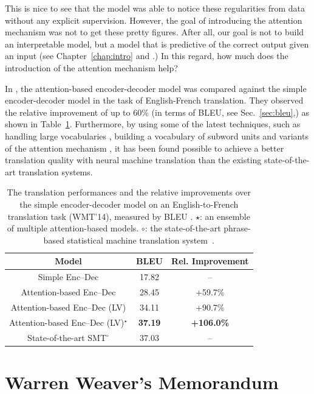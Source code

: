 \documentclass{report}
\begin{document}
This is nice to see that the model was able to notice these regularities from
data without any explicit supervision. However, the goal of introducing the
attention mechanism was not to get these pretty figures. After all, our goal is
not to build an interpretable model, but a model that is predictive of the
correct output given an input (see Chapter~\ref{chap:intro} and
\cite{breiman2001statistical}.) In this regard, how much does the introduction
of the attention mechanism help?

In \cite{bahdanau2014neural}, the attention-based encoder-decoder model was
compared against the simple encoder-decoder model in the task of English-French
translation. They observed the relative improvement of up to 60\% (in terms of
BLEU, see Sec.~\ref{sec:bleu},) as shown in Table~\ref{tab:att_nmt}.
Furthermore, by using some of the latest techniques, such as handling large
vocabularies \cite{jean2014using}, building a vocabulary of subword units
\cite{sennrich2015neural} and variants of the attention mechanism
\cite{luong2015effective}, it has been found possible to achieve a better translation
quality with neural machine translation than the existing state-of-the-art
translation systems.
    

\begin{table}[ht]
    \centering
    \begin{tabular}{c|c|c}
    Model & BLEU & Rel. Improvement \\
    \hline
    \hline
    Simple Enc--Dec & 17.82 &  -- \\
    Attention-based Enc--Dec & 28.45 & +59.7\% \\
    Attention-based Enc--Dec (LV) & 34.11 & +90.7\% \\
    Attention-based Enc--Dec (LV)$^\star$ & {\bf 37.19} & {\bf +106.0\%} \\
    \hline
    State-of-the-art SMT$^\circ$ & 37.03 & -- 
    \end{tabular}
    \caption{The translation performances and the relative improvements over the
        simple encoder-decoder model on an English-to-French translation task
        (WMT'14),
    measured by BLEU \cite{bahdanau2014neural,jean2014using}. 
$\star$: an ensemble of multiple attention-based models. $\circ$: the
state-of-the-art phrase-based statistical machine translation
system~\cite{Durrani2014}.}
    \label{tab:att_nmt}
\end{table}



\section{Warren Weaver's Memorandum}
\end{document}
